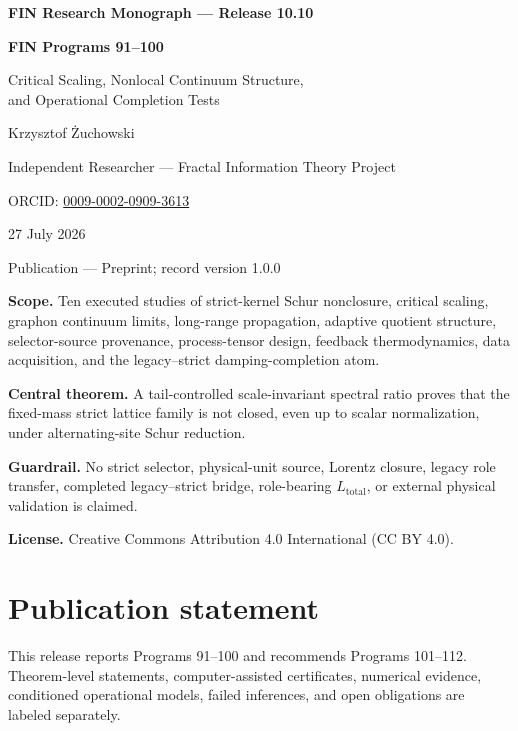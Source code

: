 \documentclass[11pt,a4paper,openany]{report}
\begin{document}
\hypersetup{pageanchor=false}
\begin{titlepage}
\centering
\vspace*{9mm}
{\Large\bfseries FIN Research Monograph --- Release 10.10\par}
\vspace{11mm}
{\Huge\bfseries FIN Programs 91--100\par}
\vspace{6mm}
{\Large Critical Scaling, Nonlocal Continuum Structure,\\
and Operational Completion Tests\par}
\vspace{17mm}
{\Large Krzysztof \.Zuchowski\par}
\vspace{2mm}
{\normalsize Independent Researcher --- Fractal Information Theory Project\par}
\vspace{2mm}
{\normalsize ORCID: \href{https://orcid.org/0009-0002-0909-3613}{0009-0002-0909-3613}\par}
\vspace{10mm}
{\large 27 July 2026\par}
{\normalsize Publication --- Preprint; record version 1.0.0\par}
\vfill
\begin{minipage}{0.88\textwidth}
\small
\textbf{Scope.} Ten executed studies of strict-kernel Schur nonclosure,
critical scaling, graphon continuum limits, long-range propagation,
adaptive quotient structure, selector-source provenance, process-tensor
design, feedback thermodynamics, data acquisition, and the
legacy--strict damping-completion atom.

\medskip
\textbf{Central theorem.} A tail-controlled scale-invariant spectral ratio
proves that the fixed-mass strict lattice family is not closed, even up to
scalar normalization, under alternating-site Schur reduction.

\medskip
\textbf{Guardrail.} No strict selector, physical-unit source, Lorentz closure,
legacy role transfer, completed legacy--strict bridge, role-bearing
\(L_{\mathrm{total}}\), or external physical validation is claimed.

\medskip
\textbf{License.} Creative Commons Attribution 4.0 International (CC BY 4.0).
\end{minipage}
\vfill
\end{titlepage}
\hypersetup{pageanchor=true}

\chapter*{Publication statement}
This release reports Programs 91--100 and recommends Programs 101--112.
Theorem-level statements, computer-assisted certificates, numerical evidence,
conditioned operational models, failed inferences, and open obligations are
labeled separately.
\end{document}
